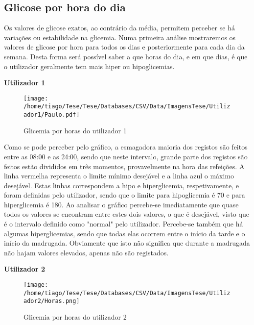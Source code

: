\subsection{Glicose por hora do dia}

Os valores de glicose exatos, ao contrário da média, permitem perceber se há variações ou estabilidade na glicemia. Numa primeira análise mostraremos os valores de glicose por hora para todos os dias e posteriormente para cada dia da semana. Desta forma será possível saber a que horas do dia, e em que dias, é que o utilizador geralmente tem mais hiper ou hipoglicemias.\newpage

\textbf{Utilizador 1}

\begin{figure}[H]
\centering
\texttt{[image: /home/tiago/Tese/Tese/Databases/CSV/Data/ImagensTese/Utilizador1/Paulo.pdf]}
\caption{Glicemia por horas do utilizador 1}
\end{figure}

Como se pode perceber pelo gráfico, a esmagadora maioria dos registos são feitos entre as 08:00 e as 24:00, sendo que neste intervalo, grande parte dos registos são feitos estão divididos em três momentos, provavelmente na hora das refeições. A linha vermelha representa o limite mínimo desejável e a linha azul o máximo desejável. Estas linhas correspondem a hipo e hiperglicemia, respetivamente, e foram definidas pelo utilizador, sendo que o limite para hipoglicemia é 70 e para hiperglicemia é 180. Ao analisar o gráfico percebe-se imediatamente que quase todos os valores se encontram entre estes dois valores, o que é desejável, visto que é o intervalo definido como "normal" pelo utilizador. Percebe-se também que há algumas hiperglicemias, sendo que todas elas ocorrem entre o início da tarde e o início da madrugada. Obviamente que isto não significa que durante a madrugada não hajam valores elevados, apenas não são registados. 


\textbf{Utilizador 2}

\begin{figure}[H]
\centering
\texttt{[image: /home/tiago/Tese/Tese/Databases/CSV/Data/ImagensTese/Utilizador2/Horas.png]}
\caption{Glicemia por horas do utilizador 2}
\end{figure}

